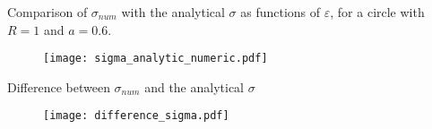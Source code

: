 \documentclass{beamer}
\begin{document}
\begin{frame}
  Comparison of $\sigma_{num}$ with the analytical $\sigma$ as functions of $\varepsilon$, for a circle with $R=1$ and $a = 0.6$.
  \begin{figure}[htbp]
    \centering
    \texttt{[image: sigma\_analytic\_numeric.pdf]}
  \end{figure}

\end{frame}

\begin{frame}
  \centerline{Difference between $\sigma_{num}$ and the analytical $\sigma$}
  \begin{figure}[htbp]
    \centering
    \texttt{[image: difference\_sigma.pdf]}
  \end{figure}

\end{frame}
\end{document}
